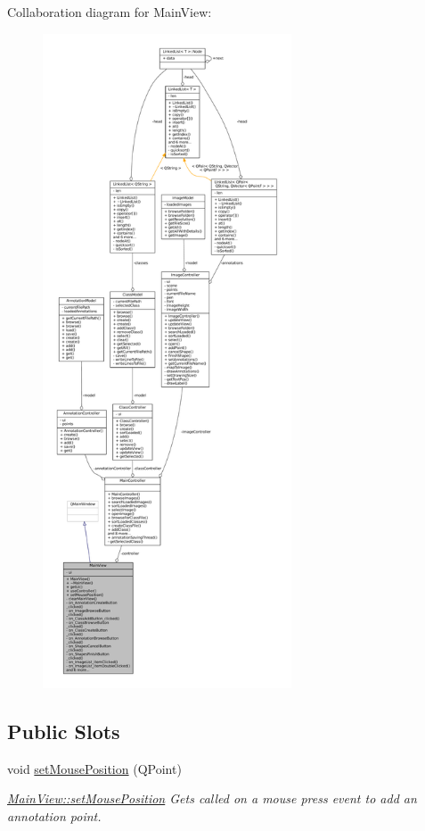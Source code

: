 Collaboration diagram for Main\+View\+:
\nopagebreak
\begin{figure}[H]
\begin{center}
\leavevmode
\includegraphics[height=550pt]{classMainView__coll__graph}
\end{center}
\end{figure}
\subsection*{Public Slots}
\begin{DoxyCompactItemize}
\item 
void \hyperlink{classMainView_ac12a2b5c72e5e1f0c924e13258186040}{set\+Mouse\+Position} (Q\+Point)
\begin{DoxyCompactList}\small\item\em \hyperlink{classMainView_ac12a2b5c72e5e1f0c924e13258186040}{Main\+View\+::set\+Mouse\+Position} Gets called on a mouse press event to add an annotation point. \end{DoxyCompactList}\end{DoxyCompactItemize}
